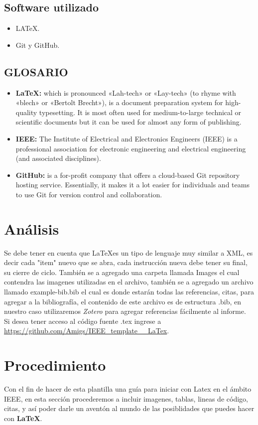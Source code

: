 \documentclass[journal, spanish]{IEEEtran}
\begin{document}
\subsection{\bf Software utilizado}
\begin{itemize}
    \item LATeX.
    \item Git y GitHub.
\end{itemize}
\subsection{\bf GLOSARIO}
\begin{itemize}
    \item {\bf LaTeX:} which is pronounced «Lah-tech» or «Lay-tech» (to rhyme with «blech» or «Bertolt Brecht»), is a document preparation system for high-quality typesetting. It is most often used for medium-to-large technical or scientific documents but it can be used for almost any form of publishing.\cite{1}
    \item {\bf IEEE:} The Institute of Electrical and Electronics Engineers (IEEE) is a professional association for electronic engineering and electrical engineering (and associated disciplines).\cite{2}
    \item {\bf GitHub:} is a for-profit company that offers a cloud-based Git repository hosting service. Essentially, it makes it a lot easier for individuals and teams to use Git for version control and collaboration.\cite{3}
\end{itemize}
\section{Análisis}
Se debe tener en cuenta que \LaTeX es un tipo de lenguaje muy similar a XML, es decir cada "item" nuevo que se abra, cada instrucción nueva debe tener su final, su cierre de ciclo. También se a agregado una carpeta llamada Images el cual contendra las imagenes utilizadas en el archivo, también se a agregado un archivo llamado example-bib.bib el cual es donde estarán todas las referencias, citas, para agregar a la bibliografía, el contenido de este archivo es de estructura .bib, en nuestro caso utilizaremos \textit{Zotero} para agregar referencias fácilmente al informe.\\
Si desea tener acceso al código fuente .tex ingrese a \url{https://github.com/Amigs/IEEE_template__LaTex}.

\section{Procedimiento}
Con el fin de hacer de esta plantilla una guía para iniciar con Latex en el ámbito IEEE, en esta sección procederemos a incluir imagenes, tablas, lineas de código, citas, y así poder darle un aventón al mundo de las posiblidades que puedes hacer con \textbf{\LaTeX}.
\end{document}
